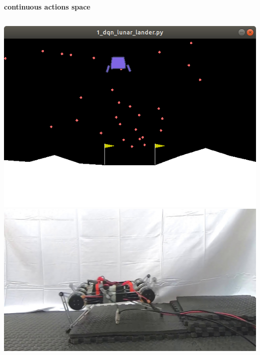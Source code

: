 \documentclass[xcolor=dvipsnames]{beamer}
\begin{document}
\begin{frame}{\bf continuous actions space}
\begin{columns}
    \begin{column}{0.5\textwidth}
      {\centering \includegraphics[scale=0.2]{../images/lunar_lander.png}}
      {\centering \includegraphics[scale=0.1]{../images/sac_minitaur.jpg}}
    \end{column}


  \end{columns}

\end{frame}
\end{document}
